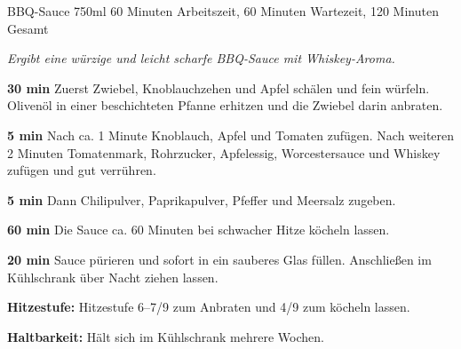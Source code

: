 \begin{recipe}{BBQ-Sauce} {750ml} {60 Minuten Arbeitszeit, 60 Minuten Wartezeit, 120 Minuten Gesamt}

  \freeform{}\textit{Ergibt eine würzige und leicht scharfe BBQ-Sauce mit Whiskey-Aroma.}


  \textbf{30 min}
  Zuerst Zwiebel, Knoblauchzehen und Apfel schälen und fein würfeln.
  Olivenöl in einer beschichteten Pfanne erhitzen und die Zwiebel darin anbraten.


  \textbf{5 min}
  Nach ca. 1 Minute Knoblauch, Apfel und Tomaten zufügen.
  Nach weiteren 2 Minuten Tomatenmark, Rohrzucker, Apfelessig, Worcestersauce und Whiskey zufügen und gut verrühren.


  \textbf{5 min}
  Dann Chilipulver, Paprikapulver, Pfeffer und Meersalz zugeben.

  \newstep{}\textbf{60 min}
  Die Sauce ca. 60 Minuten bei schwacher Hitze köcheln lassen.

  \newstep{}\textbf{20 min}
  Sauce pürieren und sofort in ein sauberes Glas füllen.
  Anschließen im Kühlschrank über Nacht ziehen lassen.

  \freeform{}\hrulefill{}

  \freeform{}\textbf{Hitzestufe:}
  Hitzestufe 6–7/9 zum Anbraten und 4/9 zum köcheln lassen.

  \freeform{}\textbf{Haltbarkeit:}
  Hält sich im Kühlschrank mehrere Wochen.

\end{recipe}
